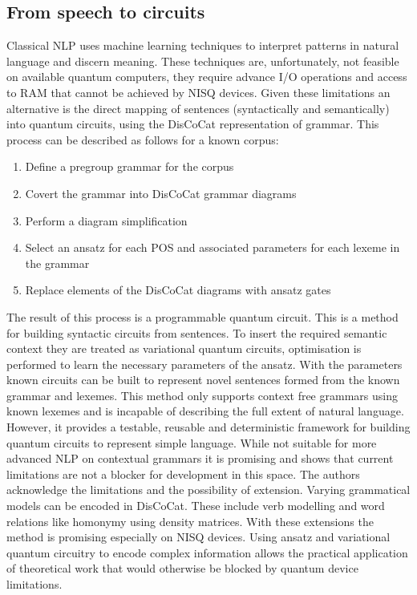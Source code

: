\documentclass[a4paper,twocolumn,11pt]{quantumarticle}
\begin{document}
    \subsection{From speech to circuits}\label{subsec:from-speech-to-circuits}
    Classical NLP uses machine learning techniques to interpret patterns in natural language and discern meaning.
    These techniques are, unfortunately, not feasible on available quantum computers, they require advance I/O
    operations and access to RAM that cannot be achieved by NISQ devices\cite{qubits_speak}.
    Given these limitations an alternative is the direct mapping of sentences (syntactically and semantically) into quantum
    circuits\cite{qubits_speak, qnlp_in_prac}, using the DisCoCat representation of grammar.
    This process can be described as follows for a known corpus\cite{qnlp_near_term}:
    \begin{enumerate}
        \item Define a pregroup grammar\cite{qnlp_near_term} for the corpus
        \item Covert the grammar into DisCoCat grammar diagrams
        \item Perform a diagram simplification\cite{qnlp_near_term}
        \item Select an ansatz for each POS and associated parameters for each lexeme in the grammar
        \item Replace elements of the DisCoCat diagrams with ansatz gates
    \end{enumerate}
    The result of this process is a programmable quantum circuit.
    This is a method for building syntactic circuits from sentences.
    To insert the required semantic context they are treated as variational quantum circuits, optimisation is
    performed to learn the necessary parameters of the ansatz\cite{qubits_speak}.
    With the parameters known circuits can be built to represent novel sentences formed from the known grammar and lexemes.
    \newline
    This method only supports context free grammars using known lexemes\cite{qubits_speak} and is incapable
    of describing the full extent of natural language.
    However, it provides a testable, reusable and deterministic framework for building
    quantum circuits to represent simple language.
    While not suitable for more advanced NLP on contextual grammars it is promising
    and shows that current limitations are not a blocker for development in this space.
    The authors acknowledge the limitations and the possibility of extension.
    Varying grammatical models can be encoded in DisCoCat\cite{qnlp_in_prac}.
    These include verb modelling and word relations like homonymy using density matrices.
    With these extensions the method is promising especially on NISQ devices.
    Using ansatz and variational quantum circuitry to encode complex information allows the practical
    application of theoretical work that would otherwise be blocked by quantum device limitations.
\end{document}
